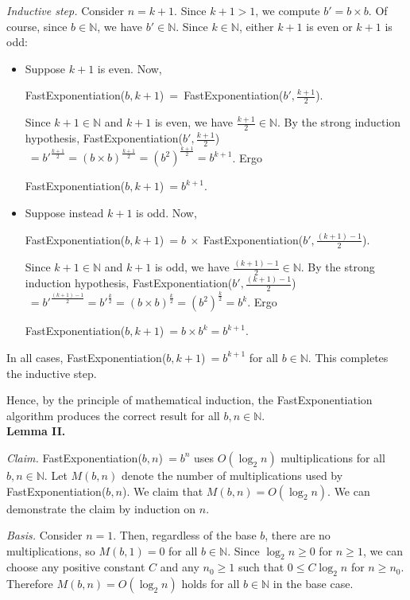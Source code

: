\begin{enumerate}
\begin{solution}
\textit{Inductive step. }Consider $n=k+1$. Since $k+1>1$, we compute $b'=b\times b$. Of course, since $b\in\mathbb{N}$, we have $b'\in\mathbb{N}$. Since $k\in\mathbb{N}$, either $k+1$ is even or $k+1$ is odd:
\begin{itemize}
\item Suppose $k+1$ is even. Now,

{\sc FastExponentiation}($b,k+1$)$~=~${\sc FastExponentiation}($b',\frac{k+1}{2}$).

Since $k+1\in\mathbb{N}$ and $k+1$ is even, we have $\frac{k+1}{2}\in\mathbb{N}$. By the strong induction hypothesis, {\sc FastExponentiation}($b',\frac{k+1}{2}$)$~={b'}^{\frac{k+1}{2}}=(b\times b)^{\frac{k+1}{2}}=(b^2)^{\frac{k+1}{2}}=b^{k+1}$. Ergo

{\sc FastExponentiation}($b,k+1$)$~=b^{k+1}$.
\item Suppose instead $k+1$ is odd. Now,

{\sc FastExponentiation}($b,k+1$)$~=b~\times~${\sc FastExponentiation}($b',\frac{(k+1)-1}{2}$).

Since $k+1\in\mathbb{N}$ and $k+1$ is odd, we have $\frac{(k+1)-1}{2}\in\mathbb{N}$. By the strong induction hypothesis, {\sc FastExponentiation}($b',\frac{(k+1)-1}{2}$)$~={b'}^{\frac{(k+1)-1}{2}}={b'}^{\frac{k}{2}}=(b\times b)^{\frac{k}{2}}=(b^2)^{\frac{k}{2}}=b^k$. Ergo

{\sc FastExponentiation}($b,k+1$)$~=b\times b^k=b^{k+1}$.
\end{itemize}

In all cases, {\sc FastExponentiation}($b,k+1$)$~=b^{k+1}$ for all $b\in\mathbb{N}$. This completes the inductive step.

Hence, by the principle of mathematical induction, the {\sc FastExponentiation} algorithm produces the correct result for all $b,n\in\mathbb{N}$.\\

\textbf{Lemma II.}

\textit{Claim. }{\sc FastExponentiation}($b,n$)$~=b^n$ uses $O(\log_2n)$ multiplications for all $b,n\in\mathbb{N}$. Let $M(b,n)$ denote the number of multiplications used by {\sc FastExponentiation}($b,n$). We claim that $M(b,n)=O(\log_2n)$. We can demonstrate the claim by induction on $n$.

\textit{Basis. }Consider $n=1$. Then, regardless of the base $b$, there are no multiplications, so $M(b,1)=0$ for all $b\in\mathbb{N}$. Since $\log_2n\geq 0$ for $n\geq 1$, we can choose any positive constant $C$ and any $n_0\geq 1$ such that $0\leq C\log_2n$ for $n\geq n_0$. Therefore $M(b,n)=O(\log_2n)$ holds for all $b\in\mathbb{N}$ in the base case.


\end{solution}
\end{enumerate}
